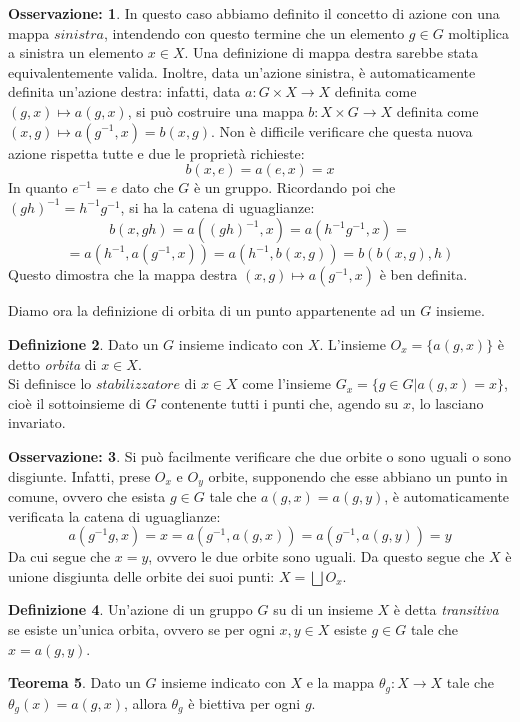 \documentclass[12pt,a4paper]{report}
\theoremstyle{definition}
\newtheorem{Def}{Definizione}[chapter]
\newtheorem{Theo}[Def]{Teorema}
\theoremstyle{definition}
\theoremstyle{definition}
\theoremstyle{definition}
\newtheorem{Obs}[Def]{Osservazione:}
\begin{document}
\begin{Obs}
In questo caso abbiamo definito il concetto di azione con una mappa $\textit{sinistra}$, intendendo con questo termine che un elemento $g\in G$ moltiplica a sinistra un elemento $x\in X$. Una definizione di mappa destra sarebbe stata equivalentemente valida. Inoltre, data un'azione sinistra, è automaticamente definita un'azione destra: infatti, data $a:G\times X\rightarrow X$ definita come $(g,x)\longmapsto a(g,x)$, si può costruire una mappa $b:X\times G\rightarrow X$ definita come $(x,g)\longmapsto a(g^{-1},x)=b(x,g)$. Non è difficile verificare che questa nuova azione rispetta tutte e due le proprietà richieste:
$$b(x,e)=a(e,x)=x$$
In quanto $e^{-1}=e$ dato che $G$ è un gruppo. Ricordando poi che $(gh)^{-1}=h^{-1}g^{-1}$, si ha la catena di uguaglianze:
$$b(x,gh)=a((gh)^{-1},x)=a(h^{-1}g^{-1},x)=$$$$=a(h^{-1},a(g^{-1},x))=a(h^{-1},b(x,g))=b(b(x,g),h)$$
Questo dimostra che la mappa destra $(x,g)\longmapsto a(g^{-1},x)$ è ben definita.
\end{Obs}
Diamo ora la definizione di orbita di un punto appartenente ad un $G$ insieme.
\begin{Def}
	Dato un $G$ insieme indicato con $X$. L'insieme $O_x=\{a(g,x)\}$ è detto \textit{orbita} di $x\in X$.\\
	Si definisce lo $\textit{stabilizzatore}$ di $x\in X$ come l'insieme $G_x=\{g\in G|a(g,x)=x\}$, cioè il sottoinsieme di $G$ contenente tutti i punti che, agendo su $x$, lo lasciano invariato.  
\end{Def}
\begin{Obs}
	Si può facilmente verificare che due orbite o sono uguali o sono disgiunte. Infatti, prese $O_x$ e $O_y$ orbite, supponendo che esse abbiano un punto in comune, ovvero che esista $g\in G$ tale che $a(g,x)=a(g,y)$, è automaticamente verificata la catena di uguaglianze:
	$$a(g^{-1}g,x)=x=a(g^{-1},a(g,x))=a(g^{-1},a(g,y))=y$$
	Da cui segue che $x=y$, ovvero le due orbite sono uguali.
	Da questo segue che $X$ è unione disgiunta delle orbite dei suoi punti: $X=\bigsqcup O_x$.
\end{Obs}
\begin{Def}
	Un'azione di un gruppo $G$ su di un insieme $X$ è detta \textit{transitiva} se esiste un'unica orbita, ovvero se per ogni $x,y\in X$ esiste $g\in G$ tale che $x=a(g,y)$.
\end{Def}
\begin{Theo}
	Dato un $G$ insieme indicato con $X$ e la mappa $\theta_g:X\rightarrow X$ tale che $\theta_g(x)=a(g,x)$, allora $\theta_g$ è biettiva per ogni $g$.
\end{Theo}
\end{document}
